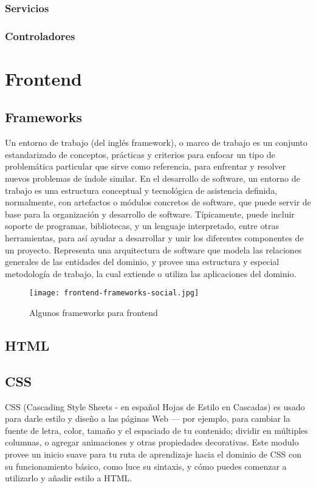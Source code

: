 \subsubsection{Servicios}
\subsubsection{Controladores}

\section{Frontend}
\subsection{Frameworks}

\cite{wiki}Un entorno de trabajo (del inglés framework), o marco de trabajo es un conjunto estandarizado
de conceptos, prácticas y criterios para enfocar un tipo de problemática particular que sirve como
referencia, para enfrentar y resolver nuevos problemas de índole similar.
En el desarrollo de software, un entorno de trabajo es una estructura conceptual y tecnológica
de asistencia definida, normalmente, con artefactos o módulos concretos de software, que puede
servir de base para la organización y desarrollo de software. Típicamente, puede incluir soporte
de programas, bibliotecas, y un lenguaje interpretado, entre otras herramientas, para así ayudar a
desarrollar y unir los diferentes componentes de un proyecto.
Representa una arquitectura de software que modela las relaciones generales de las entidades del
dominio, y provee una estructura y especial metodología de trabajo, la cual extiende o utiliza las
aplicaciones del dominio.

\begin{figure}[H]
	\center
	\texttt{[image: frontend-frameworks-social.jpg]}
	\caption{Algunos frameworks para frontend}
	\label{fig:super}
\end{figure}

\subsection{HTML}


\subsection{CSS}

\cite{mdn}CSS (Cascading Style Sheets - en español Hojas de Estilo en Cascadas) es usado para darle estilo y diseño a las páginas Web — por ejemplo, para cambiar la fuente de letra, color, tamaño y el espaciado de tu contenido; dividir en múltiples columnas, o agregar animaciones y otras propiedades decorativas. Este modulo provee un inicio suave para tu ruta de aprendizaje hacia el dominio de CSS con su funcionamiento básico, como luce su sintaxis, y cómo puedes comenzar a utilizarlo y añadir estilo a HTML.

